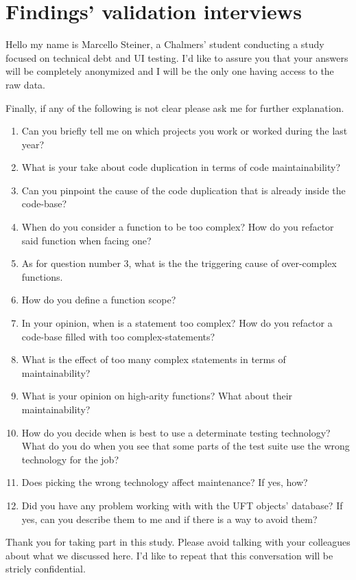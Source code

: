 \chapter{Findings' validation interviews} \label{app:interview}

Hello my name is Marcello Steiner, a Chalmers' student conducting a study focused on technical debt and UI testing. I'd like to assure you that your answers will be completely anonymized and I will be the only one having access to the raw data.

Finally, if any of the following is not clear please ask me for further explanation.


\begin{enumerate}
    \item Can you briefly tell me on which projects you work or worked during the last year?
    
    \item What is your take about code duplication in terms of code maintainability?
    
    \item Can you pinpoint the cause of the code duplication that is already inside the code-base?
    
    \item When do you consider a function to be too complex? How do you refactor said function when facing one?
    
    \item As for question number 3, what is the the triggering cause of over-complex functions.
    
    \item How do you define a function scope?
    
    \item In your opinion, when is a statement too complex? How do you refactor a code-base filled with too complex-statements?
    
    \item What is the effect of too many complex statements in terms of maintainability?
    
    \item What is your opinion on high-arity functions? What about their maintainability?
    
    \item How do you decide when is best to use a determinate testing technology? What do you do when you see that some parts of the test suite use the wrong technology for the job?
    
    \item Does picking the wrong technology affect maintenance? If yes, how?
    
    \item Did you have any problem working with with the UFT objects' database? If yes, can you describe them to me and if there is a way to avoid them?
    
    
\end{enumerate}

Thank you for taking part in this study. Please avoid talking with your colleagues about what we discussed here. I'd like to repeat that this conversation will be stricly confidential.